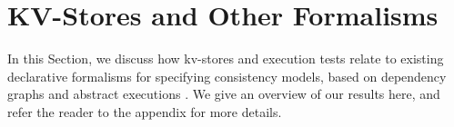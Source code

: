 \newcommand{\execs}{\ensuremath{\mathsf{Execs}}}

\section{KV-Stores and Other Formalisms}
\label{sec:other_formalisms}
%
In this Section, we discuss how kv-stores and execution 
tests relate to existing declarative formalisms for specifying  
consistency models, based on dependency graphs \cite{adya} 
and abstract executions \cite{framework-concur}. 
We give an overview of our results here, and refer the reader to the 
appendix for more details.

